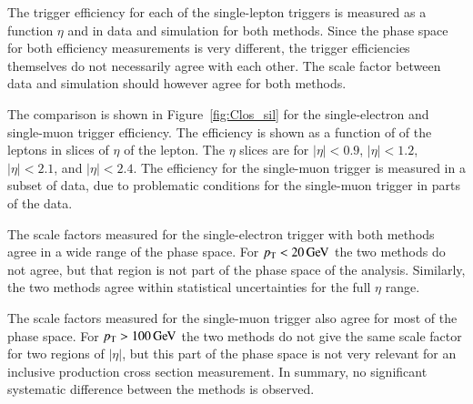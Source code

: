 The trigger efficiency for each of the single-lepton triggers is measured as a function $\eta$ and \pt in data and simulation for both methods.
Since the phase space for both efficiency measurements is very different, the trigger efficiencies themselves do not necessarily agree with each other.
The scale factor between data and simulation should however agree for both methods.

The comparison is shown in Figure~\ref{fig:Clos_sil} for the single-electron and single-muon trigger efficiency. The efficiency is shown as a function of \pt of the leptons in slices of $\eta$ of the lepton.
The $\eta$ slices are for $|\eta|<0.9$, $|\eta|<1.2$, $|\eta|<2.1$, and $|\eta|<2.4$.
The efficiency for the single-muon trigger is measured in a subset of data, due to problematic conditions for the single-muon trigger in parts of the data.

The scale factors measured for the single-electron trigger with both methods agree in a wide range of the phase space. For $p_{\mathrm{T}} < 20 \,\text{Ge\hspace{-.08em}V}$ the two methods do not agree, but that region is not part of the phase space of the analysis.
Similarly, the two methods agree within statistical uncertainties for the full $\eta$ range.

The scale factors measured for the single-muon trigger also agree for most of the phase space. For $p_{\mathrm{T}} > 100 \,\text{Ge\hspace{-.08em}V}$ the two methods do not give the same scale factor for two regions of $|\eta|$, but this part of the phase space
is not very relevant for an inclusive \ttbar production cross section measurement.
In summary, no significant systematic difference between the methods is observed.


